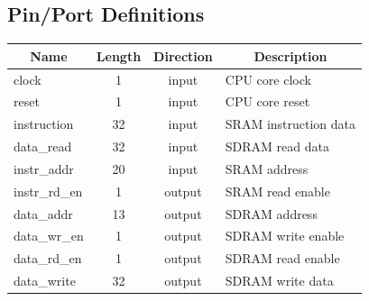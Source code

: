 \documentclass{article}
\begin{document}
 
  \subsection{Pin/Port Definitions}
  \FloatBarrier
  \begin{table}[H]
    \begin{center}
      \begin{tabular}[pos]{| l | c | c | m{7cm} |} \hline 	
      \multicolumn{1}{|c|}{\cellcolor[gray]{0.9}\textbf{Name}} & 
      \multicolumn{1}{c|}{\cellcolor[gray]{0.9}\textbf{Length}} & 
      \multicolumn{1}{c|}{\cellcolor[gray]{0.9}\textbf{Direction}} &
      \multicolumn{1}{c|}{\cellcolor[gray]{0.9}\textbf{Description}} \\ \hline
	 clock 		& 1 	& input 	& CPU core clock  	\\ \hline
	 reset 		& 1	& input		& CPU core reset  	\\ \hline
	 instruction 	& 32	& input 	& SRAM instruction data \\ \hline
	 data\_read 	& 32	& input 	& SDRAM read data \\ \hline
	 instr\_addr 	& 20	& input 	& SRAM address \\ \hline
	 instr\_rd\_en 	& 1	& output 	& SRAM read enable  \\ \hline
	 data\_addr 	& 13	& output	& SDRAM address \\ \hline
	 data\_wr\_en 	& 1	& output 	& SDRAM write enable  \\ \hline
	 data\_rd\_en 	& 1	& output 	& SDRAM read enable  \\ \hline
   data\_write   & 32 & output  & SDRAM write data  \\ \hline
      \end{tabular}
    \end{center}
  \end{table}  

\newpage
\end{document}
